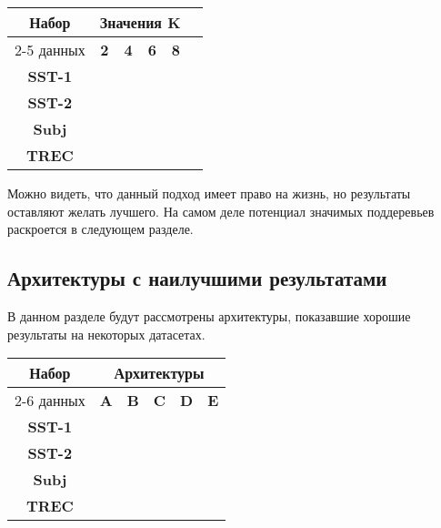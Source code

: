 \vspace{5mm}
\noindent \begin{minipage}{\linewidth}
 \label{tab:title} 
\begin{tabular}{|c|c|c|c|c|c|}
\hline
\multirow{2}{*}{Набор}   &  \multicolumn{4}{c|}{Значения K} \\ \cline{2-5} 
     данных              &  \textbf{2}  & \textbf{4}   & \textbf{6} & \textbf{8} \\ \hline
\textbf{SST-1}           &              &              &            &            \\ \hline
\textbf{SST-2}           &              &              &            &            \\ \hline
\textbf{Subj}            &              &              &            &            \\ \hline
\textbf{TREC}            &              &              &            &            \\ \hline
\end{tabular}
\end{minipage}
\vspace{5mm}


Можно видеть, что данный подход имеет право на жизнь, но результаты оставляют желать лучшего.
На самом деле потенциал значимых поддеревьев раскроется в следующем разделе.

\subsection{Архитектуры с наилучшими результатами}

В данном разделе будут рассмотрены архитектуры, показавшие хорошие результаты на некоторых датасетах.

\vspace{5mm}
\noindent \begin{minipage}{\linewidth}
 \label{tab:title} 
\begin{tabular}{|c|c|c|c|c|c|}
\hline
\multirow{2}{*}{Набор}   &             \multicolumn{5}{c|}{Архитектуры} \\ \cline{2-6} 
     данных              &  \textbf{A}  & \textbf{B} & \textbf{C} & \textbf{D} & \textbf{E} \\ \hline
\textbf{SST-1}           &              &            &            &            &            \\ \hline
\textbf{SST-2}           &              &            &            &            &            \\ \hline
\textbf{Subj}            &              &            &            &            &            \\ \hline
\textbf{TREC}            &              &            &            &            &            \\ \hline
\end{tabular}
\end{minipage}
\vspace{5mm}

